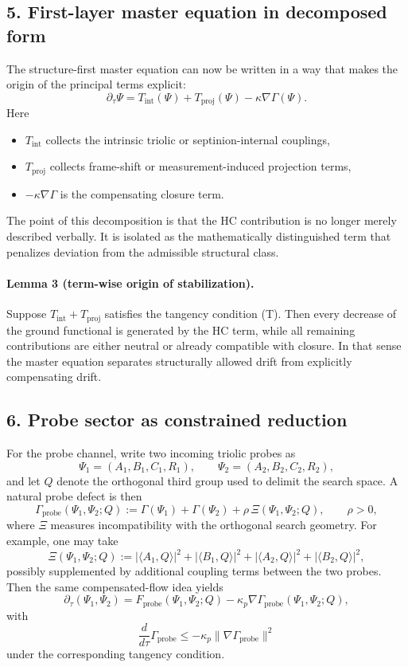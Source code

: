 \documentclass[12pt,a4paper]{article}
\begin{document}
\subsection*{5. First-layer master equation in decomposed form}
The structure-first master equation can now be written in a way that makes the
origin of the principal terms explicit:
\[
\partial_\tau \Psi
= T_{\mathrm{int}}(\Psi)
+ T_{\mathrm{proj}}(\Psi)
- \kappa\nabla\Gamma(\Psi).
\]
Here
\begin{itemize}
 \item $T_{\mathrm{int}}$ collects the intrinsic triolic or septinion-internal
 couplings,
 \item $T_{\mathrm{proj}}$ collects frame-shift or measurement-induced projection
 terms,
 \item $-\kappa\nabla\Gamma$ is the compensating closure term.
\end{itemize}
The point of this decomposition is that the HC contribution is no longer merely
described verbally. It is isolated as the mathematically distinguished term that
penalizes deviation from the admissible structural class.

\paragraph{Lemma 3 (term-wise origin of stabilization).}
Suppose $T_{\mathrm{int}}+T_{\mathrm{proj}}$ satisfies the tangency condition
\textup{(T)}. Then every decrease of the ground functional is generated by the HC
term, while all remaining contributions are either neutral or already
compatible with closure. In that sense the master equation separates
structurally allowed drift from explicitly compensating drift.

\subsection*{6. Probe sector as constrained reduction}
For the probe channel, write two incoming triolic probes as
\[
\Psi_1=(A_1,B_1,C_1,R_1), \qquad \Psi_2=(A_2,B_2,C_2,R_2),
\]
and let $Q$ denote the orthogonal third group used to delimit the search space.
A natural probe defect is then
\[
\Gamma_{\mathrm{probe}}(\Psi_1,\Psi_2;Q)
:= \Gamma(\Psi_1)+\Gamma(\Psi_2)
 + \rho\,\Xi(\Psi_1,\Psi_2;Q), \qquad \rho>0,
\]
where $\Xi$ measures incompatibility with the orthogonal search geometry. For
example, one may take
\[
\Xi(\Psi_1,\Psi_2;Q)
:= |\langle A_1,Q\rangle|^2 + |\langle B_1,Q\rangle|^2
 + |\langle A_2,Q\rangle|^2 + |\langle B_2,Q\rangle|^2,
\]
possibly supplemented by additional coupling terms between the two probes.
Then the same compensated-flow idea yields
\[
\partial_\tau(\Psi_1,\Psi_2)
= F_{\mathrm{probe}}(\Psi_1,\Psi_2;Q)
- \kappa_p\nabla\Gamma_{\mathrm{probe}}(\Psi_1,\Psi_2;Q),
\]
with
\[
\frac{d}{d\tau}\Gamma_{\mathrm{probe}} \le -\kappa_p
\|\nabla\Gamma_{\mathrm{probe}}\|^2
\]
under the corresponding tangency condition.
\end{document}
